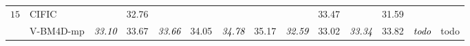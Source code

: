 \documentclass[10pt, journal, twocolumn, final, a4paper]{IEEEtran}
\newcommand{\best}[1]{#1}
\newcommand{\bsic}[1]{\textcolor{black}{\textit{#1}}}
\begin{document}
\begin{table}[htp!]
\begin{center}
{\begin{tabular}{ c | l |c c | c c | c c | c c | c c | c c}
%                                                                                                                                                                                                                                         
			\multirow{1}{*}{$15$}
			                      & CIFIC                & \bsic{     } &       32.76  & \bsic{     } &              & \bsic{     } &              & \bsic{     } &       33.47  & \bsic{     } &       31.59  & \bsic{     } &              \\
			                      & V-BM4D-mp            & \bsic{33.10} &       33.67  & \bsic{33.66} &       34.05  & \bsic{34.78} &       35.17  & \bsic{32.59} &       33.02  & \bsic{33.34} &       33.82  & \bsic{todo } &       todo   \\

\end{tabular}}
\end{center}
\end{table}
\end{document}
